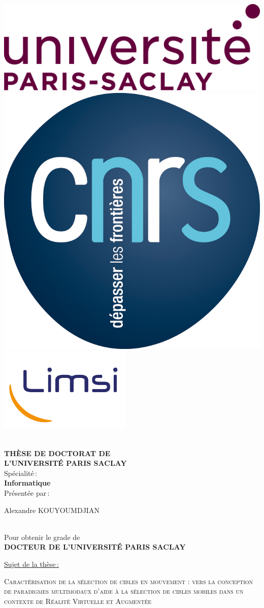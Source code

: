 \begin{titlepage}

\includegraphics[height=2.cm]{./figures/garde/logo_paris_saclay}\hfill
\includegraphics[height=2.cm]{./figures/garde/logo_CNRS}\hfill
\includegraphics[height=2.cm]{./figures/garde/limsilogo_new_transparent_crop}\hfill
\\
\\


\begin{center}
 \textbf{THÈSE DE DOCTORAT DE\\ L'UNIVERSITÉ PARIS SACLAY\\}
Spécialité\,:\\
\textbf{Informatique}\\ 
Présentée par\,:\\ 
\begin{LARGE}
Alexandre KOUYOUMDJIAN\end{LARGE}\\
Pour obtenir le grade de\\
\textbf{DOCTEUR DE L'UNIVERSITÉ PARIS SACLAY}
\end{center}

\noindent \underline{Sujet de la thèse\,: }\\
\begin{center}
\begin{Large}
{\textsc{Caractérisation de la sélection de cibles en mouvement : vers la conception de paradigmes multimodaux d'aide à la sélection de cibles mobiles dans un contexte de Réalité Virtuelle et Augmentée}}
\end{Large}
\end{center}


\end{titlepage}
